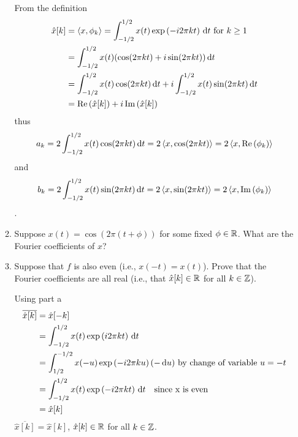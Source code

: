 \documentclass[12pt,twoside]{article}
\begin{document}
\begin{enumerate}
\begin{enumerate}
    From the definition 
   \begin{align*}
  				 \hat{x}[k] 	&= \left \langle x, \phi_k\right \rangle = \int_{-1/2}^{1/2} x(t) \exp \left( - i2 \pi k t \right)  \, \text{d}t   \text{ for } k\geq 1\\
				 		&=  	\int_{-1/2}^{1/2} x(t) (\cos(2\pi k t) + i \sin(2\pi k t)) \, \text{d}t \\
						&=	 \int_{-1/2}^{1/2} x(t)  \cos(2\pi k t) \, \text{d}t + i \int_{-1/2}^{1/2} x(t) \sin(2\pi k t) \, \text{d}t \\
						&=	\operatorname{Re}\left(   \hat{x}[k]  \right) + i   \operatorname{Im}\left(  \hat{x}[k]   \right) \\			
   \end{align*}
   thus 
   $$a_k =2 \int_{-1/2}^{1/2} x(t)  \cos(2\pi k t) \, \text{d}t = 2  \left \langle x,  \cos(2\pi k t) \right \rangle =  2  \left \langle x, \operatorname{Re}\left(   \phi_k  \right)\right \rangle $$ 
   and $$b_k =  2 \int_{-1/2}^{1/2} x(t)   \sin(2\pi k t) \, \text{d}t = 2  \left \langle x,  \sin(2\pi k t) \right \rangle =  2  \left \langle x, \operatorname{Im}\left(   \phi_k  \right)\right \rangle$$.
          
  \item Suppose $x(t)=\cos(2\pi(t+\phi))$ for some fixed
    $\phi\in\mathbb{R}$.  What are the Fourier coefficients of $x$?
  \item Suppose that $f$ is also even (i.e., $x(-t)=x(t)$).  Prove
    that the Fourier coefficients are all real (i.e., that
    $\hat{x}[k]\in\mathbb{R}$ for all $k\in\mathbb{Z}$).
    
    Using part a
      \begin{align*}
      	\overline{\hat{x}[k]}	&= 	\hat{x}[-k] \\
					&= 	\int_{-1/2}^{1/2} x(t) \exp \left( i 2 \pi k t \right)  \, \text{d}t \\
					&= 	\int_{1/2}^{-1/2} x(-u) \exp \left( - i 2 \pi k u \right)  (- \, \text{d}u)  \text{ by change of variable } u = -t \\
					&=	\int_{-1/2}^{1/2} x(t) \exp \left( - i 2 \pi k t \right)  \, \text{d}t \text{ ~ since x is even }\\
					&=	\hat{x}[k] \\
       \end{align*}  
       $\overline{\hat{x}[k]} = \hat{x}[k]$, $\hat{x}[k]  \in \mathbb{R}$ for all $k\in\mathbb{Z}$.
       
  \end{enumerate} 
   
 \end{enumerate}
\end{document}
